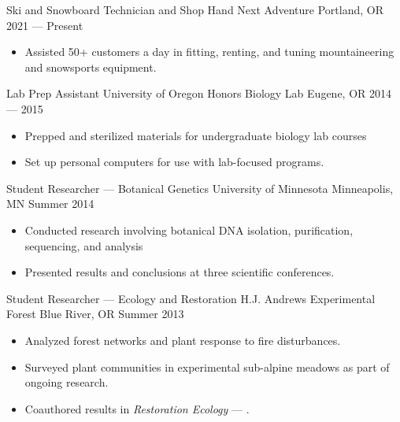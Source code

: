 \showoff
{Ski and Snowboard Technician and Shop Hand}
{Next Adventure}
{Portland, OR}
{2021 --- Present}
\begin{itemize}[label=$\triangleright$]
    \item Assisted 50+ customers a day in fitting, renting, and tuning mountaineering and snowsports equipment.
\end{itemize}

\myBreak

\showoff
{Lab Prep Assistant}
{University of Oregon Honors Biology Lab}
{Eugene, OR}
{2014 --- 2015}
\begin{itemize}[label=$\triangleright$]
    \item Prepped and sterilized materials for undergraduate biology lab courses
    \item Set up personal computers for use with lab-focused programs.
\end{itemize}

\myBreak

\showoff
{Student Researcher --- Botanical Genetics}
{University of Minnesota}
{Minneapolis, MN}
{Summer 2014}
\begin{itemize}[label=$\triangleright$]
    \item Conducted research involving botanical DNA isolation, purification, sequencing, and analysis
    \item Presented results and conclusions at three scientific conferences.
\end{itemize}

\myBreak

\showoff
{Student Researcher --- Ecology and Restoration}
{H.J. Andrews Experimental Forest}
{Blue River, OR}
{Summer 2013}
\begin{itemize}[label=$\triangleright$]
    \item Analyzed forest networks and plant response to fire disturbances.
    \item Surveyed plant communities in experimental sub-alpine meadows as part of ongoing research.
    \item Coauthored results in \emph{Restoration Ecology} --- .
\end{itemize}

